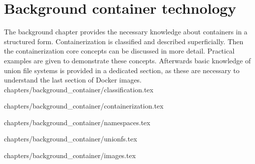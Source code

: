\chapter{Background container technology}
\label{ch:back}

The background chapter provides the necessary knowledge about containers in a structured form.
Containerization is classified and described superficially. Then the containerization core concepts can be discussed in more detail.
Practical examples are given to demonstrate these concepts.
Afterwards basic knowledge of union file systems is provided in a dedicated section, as these are necessary to understand the last section of Docker images.
 {chapters/background_container/classification.tex}

 {chapters/background_container/containerization.tex}

 {chapters/background_container/namespaces.tex}


 {chapters/background_container/unionfs.tex}

 {chapters/background_container/images.tex}

















